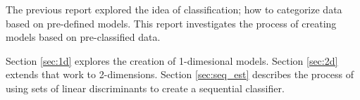The previous report explored the idea of classification; how to categorize data
based on pre-defined models. This report investigates the process of creating
models based on pre-classified data.

Section \ref{sec:1d} explores the creation of 1-dimesional models. Section
\ref{sec:2d} extends that work to 2-dimensions. Section \ref{sec:seq_est}
describes the process of using sets of linear discriminants to create a
sequential classifier.